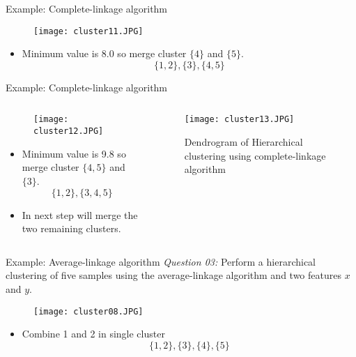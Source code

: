\begin{frame}{Example: Complete-linkage algorithm}
\begin{figure}
\texttt{[image: cluster11.JPG]}
\end{figure}
\begin{itemize}
\item Minimum value is 8.0 so merge cluster $\{4\}$ and $\{5\}$.
\begin{equation}
\{1,2\},\{3\},\{4,5\}\nonumber
\end{equation}
\end{itemize}
\end{frame}

\begin{frame}{Example: Complete-linkage algorithm}
\begin{columns}
\begin{column}{5cm}
\begin{figure}
\texttt{[image: cluster12.JPG]}
\end{figure}
\begin{itemize}
\item Minimum value is 9.8 so merge cluster $\{4,5\}$ and $\{3\}$.
\begin{equation}
\{1,2\},\{3,4,5\}\nonumber
\end{equation}
\item In next step will merge the two remaining clusters.
\end{itemize}
\end{column}
\begin{column}{5.5cm}
\begin{figure}
\texttt{[image: cluster13.JPG]}
\caption{Dendrogram of Hierarchical clustering using complete-linkage algorithm}
\end{figure}
\end{column}
\end{columns}
\end{frame}

\begin{frame}{Example: Average-linkage algorithm}
\textit{\color{slidecolor}Question 03:} Perform a hierarchical clustering of five samples using the average-linkage algorithm and two features $x$ and $y$.
\begin{figure}
\texttt{[image: cluster08.JPG]}
\end{figure}
\begin{itemize}
\item Combine 1 and 2 in single cluster
\begin{equation}
\{1,2\},\{3\},\{4\},\{5\}\nonumber
\end{equation}
\end{itemize}
\end{frame}

